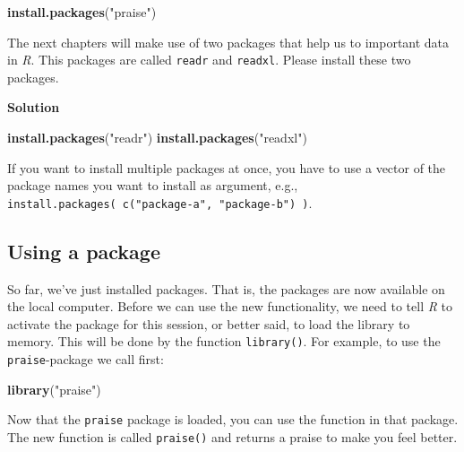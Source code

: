 \documentclass[
]{scrartcl}
\makeatletter
\newenvironment{Shaded}{\begin{snugshade}}{\end{snugshade}}
\newcommand{\KeywordTok}[1]{\textcolor[rgb]{0.13,0.29,0.53}{\textbf{#1}}}
\newcommand{\NormalTok}[1]{#1}
\newcommand{\StringTok}[1]{\textcolor[rgb]{0.31,0.60,0.02}{#1}}
\newenvironment{kframe}{%
\medskip{}
\setlength{\fboxsep}{.8em}
 \def\at@end@of@kframe{}%
 \ifinner\ifhmode%
  \def\at@end@of@kframe{\end{minipage}}%
  \begin{minipage}{\columnwidth}%
 \fi\fi%
 \def\FrameCommand##1{\hskip\@totalleftmargin \hskip-\fboxsep
 \colorbox{shadecolor}{##1}\hskip-\fboxsep
     \hskip-\linewidth \hskip-\@totalleftmargin \hskip\columnwidth}%
 \MakeFramed {\advance\hsize-\width
   \@totalleftmargin\z@ \linewidth\hsize
   \@setminipage}}%
 {\par\unskip\endMakeFramed%
 \at@end@of@kframe}
\newenvironment{rmdblock}[1]
  {
  \begin{itemize}
  \renewcommand{\labelitemi}{
    \raisebox{-.7\height}[0pt][0pt]{
      {\setkeys{Gin}{width=3em,keepaspectratio}\texttt{[image: images/\#1]}}
    }
  }
  \setlength{\fboxsep}{1em}
  \begin{kframe}
  \item
  }
  {
  \end{kframe}
  \end{itemize}
  }
\newenvironment{geek}
    {\begin{rmdblock}{geek}}
    {\end{rmdblock}}
\newenvironment{myexercise}
    {\begin{rmdblock}{exercise_green}}
    {\end{rmdblock}}
\newenvironment{webexsolution}[1]
    {\par\tiny\textbf{#1}}
    {\par}
\newcommand{\webexhide}[1]{\begin{webexsolution}{#1}}
\newcommand{\webexunhide}{\end{webexsolution}}
\makeatother
\begin{document}
\begin{Shaded}
\begin{Highlighting}[]
\KeywordTok{install.packages}\NormalTok{(}\StringTok{"praise"}\NormalTok{)}
\end{Highlighting}
\end{Shaded}

\begin{myexercise}
The next chapters will make use of two packages that help us to
important data in \emph{R}. This packages are called \texttt{readr} and
\texttt{readxl}. Please install these two packages.
\end{myexercise}
\webexhide{Solution}

\begin{Shaded}
\begin{Highlighting}[]
\KeywordTok{install.packages}\NormalTok{(}\StringTok{"readr"}\NormalTok{)}
\KeywordTok{install.packages}\NormalTok{(}\StringTok{"readxl"}\NormalTok{)}
\end{Highlighting}
\end{Shaded}

\webexunhide

\begin{geek}
If you want to install multiple packages at once, you have to use a
vector of the package names you want to install as argument, e.g.,
\texttt{install.packages(\ c("package-a",\ "package-b")\ )}.
\end{geek}

\hypertarget{using-a-package}{%
\subsection{Using a package}\label{using-a-package}}

So far, we've just installed packages. That is, the packages are now available on the local computer. Before we can use the new functionality, we need to tell \emph{R} to activate the package for this session, or better said, to load the library to memory. This will be done by the function \texttt{library()}. For example, to use the \texttt{praise}-package we call first:

\begin{Shaded}
\begin{Highlighting}[]
\KeywordTok{library}\NormalTok{(}\StringTok{"praise"}\NormalTok{)}
\end{Highlighting}
\end{Shaded}

Now that the \texttt{praise} package is loaded, you can use the function in that package. The new function is called \texttt{praise()} and returns a praise to make you feel better.
\end{document}

